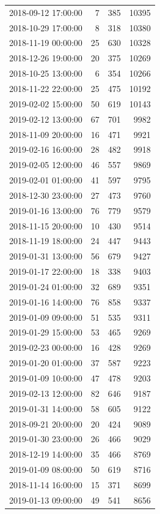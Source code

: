 \begin{tabular}{lrrr}
2018-09-12 17:00:00 & 7 & 385 & 10395 \\
2018-10-29 17:00:00 & 8 & 318 & 10380 \\
2018-11-19 00:00:00 & 25 & 630 & 10328 \\
2018-12-26 19:00:00 & 20 & 375 & 10269 \\
2018-10-25 13:00:00 & 6 & 354 & 10266 \\
2018-11-22 22:00:00 & 25 & 475 & 10192 \\
2019-02-02 15:00:00 & 50 & 619 & 10143 \\
2019-02-12 13:00:00 & 67 & 701 & 9982 \\
2018-11-09 20:00:00 & 16 & 471 & 9921 \\
2019-02-16 16:00:00 & 28 & 482 & 9918 \\
2019-02-05 12:00:00 & 46 & 557 & 9869 \\
2019-02-01 01:00:00 & 41 & 597 & 9795 \\
2018-12-30 23:00:00 & 27 & 473 & 9760 \\
2019-01-16 13:00:00 & 76 & 779 & 9579 \\
2018-11-15 20:00:00 & 10 & 430 & 9514 \\
2018-11-19 18:00:00 & 24 & 447 & 9443 \\
2019-01-31 13:00:00 & 56 & 679 & 9427 \\
2019-01-17 22:00:00 & 18 & 338 & 9403 \\
2019-01-24 01:00:00 & 32 & 689 & 9351 \\
2019-01-16 14:00:00 & 76 & 858 & 9337 \\
2019-01-09 09:00:00 & 51 & 535 & 9311 \\
2019-01-29 15:00:00 & 53 & 465 & 9269 \\
2019-02-23 00:00:00 & 16 & 428 & 9269 \\
2019-01-20 01:00:00 & 37 & 587 & 9223 \\
2019-01-09 10:00:00 & 47 & 478 & 9203 \\
2019-02-13 12:00:00 & 82 & 646 & 9187 \\
2019-01-31 14:00:00 & 58 & 605 & 9122 \\
2018-09-21 20:00:00 & 20 & 424 & 9089 \\
2019-01-30 23:00:00 & 26 & 466 & 9029 \\
2018-12-19 14:00:00 & 35 & 466 & 8769 \\
2019-01-09 08:00:00 & 50 & 619 & 8716 \\
2018-11-14 16:00:00 & 15 & 371 & 8699 \\
2019-01-13 09:00:00 & 49 & 541 & 8656 \\

\end{tabular}
